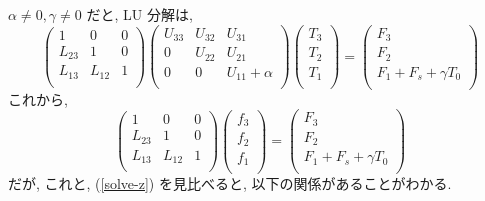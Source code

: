 $\alpha \neq 0, \gamma \neq 0$ だと, LU 分解は, 
%
\begin{equation}
  \left( \begin{array}{lll}
         1      & 0      & 0      \\
         L_{23} & 1      & 0      \\
         L_{13} & L_{12} & 1      \\
         \end{array} \right)
  \left( \begin{array}{lll}
         U_{33} & U_{32} & U_{31} \\
         0      & U_{22} & U_{21} \\
         0      & 0      & U_{11}+\alpha \\
         \end{array} \right)
  \left( \begin{array}{l}
         T_3 \\ T_2 \\ T_1 \\
         \end{array} \right)
  = 
  \left(  \begin{array}{l}
          F_3 \\ F_2 \\ F_1 + F_s + \gamma T_0 \\
          \end{array} \right)
\end{equation}
%
これから, 
%
\begin{equation}
  \left( \begin{array}{lll}
         1      & 0      & 0      \\
         L_{23} & 1      & 0      \\
         L_{13} & L_{12} & 1      \\
         \end{array} \right)
  \left( \begin{array}{l}
         f_3 \\ f_2 \\ f_1 \\
         \end{array} \right)
  = 
  \left(  \begin{array}{l}
          F_3 \\ F_2 \\ F_1 + F_s + \gamma T_0 \\
          \end{array} \right)
\end{equation}
%
だが, これと, (\ref{solve-z}) を見比べると, 以下の関係があることがわかる.

